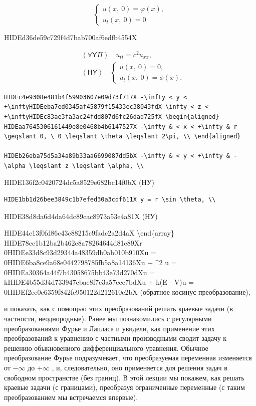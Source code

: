 \documentclass[
  ukrainian,
]{article}
\begin{document}
\[
\begin{cases} u(x, \ 0) = \varphi(x), \\ u_t(x, \ 0) = 0 \end{cases}
\]

HIDEd36de59c729f4d7bab700af6edfb4554X

\[
\begin{aligned} & (\forall \mathsf{Y}\Pi) \quad u_{tt} = c^2 u_{xx}, \\ & (\mathsf{H} \mathsf{Y}) \quad \begin{cases} u\left(x, \ 0\right) = 0, \\ u_t\left(x, \ 0\right) = \phi\left(x\right). \end{cases} \end{aligned}
\]

\begin{verbatim}
HIDEc4e9308e481b4f59903607e09d73f717X -\infty < y < +\inftyHIDEeba7ed0345af45879f15433ec38043fdX-\infty < z < +\inftyHIDEc83ae3fa3ac24fdd807d6fc26dad725fX \begin{aligned}
HIDEaa7645306161449e8e0468b4b6147527X -\infty & < x < +\infty & r \geqslant 0, \ 0 \leqslant \theta \leqslant 2\pi, \\ \end{aligned}

HIDEb26eba75d5a34a89b33aa6699087dd5bX -\infty & < y < +\infty & -\alpha \leqslant z \leqslant \alpha, \\
\end{verbatim}

HIDE136f2c0420724dc5a8529e682bc14f0bX (НУ)

\begin{verbatim}
HIDE1bb1d26bee3849c1b7efed30a3cdf611X y = r \sin \theta, \\
\end{verbatim}

HIDE38d8da6d4da64dc89cac8973a53e4a81X (НУ)

HIDE44c13f0fd86c43c88215c9fadc2a2d4aX \textbackslash end\{array\}
HIDE78ee1b12ba2b462e8a78264644d81e89Xr
\geqslant 0HIDEe33d8c93d29344a48359db0ab010b910X\Delta u =
0HIDE6ba8ce9a68e0442798785fb5a8a14136X\Delta u + \lambda\^{}2 u =
0HIDEa30364a44f7b43058675bb43e73d270dX\Delta u =
kHIDE4b55d34d733947cbae8f7c3a57ece7bdX\Delta u + k(E - V)u =
0HIDEf2ee0e6359f842fe950122d212610c2bX (обратное
косинус-преобразование),

и показать, как с помощью этих преобразований решать краевые задачи (в
частности, неоднородные). Ранее мы познакомились с регулярными
преобразованиями Фурье и Лапласа и увидели, как применение этих
преобразований к уравнению с частными производными сводит задачу к
решению обыкновениого дифференциального уравнения. Обычное
преобразование Фурье подразумевает, что преобразуемая переменная
изменяется от \(-\infty\) до \(+\infty\) , и, следовательно, оно
применяется для решения задач в свободном пространстве (без границ). В
этой лекции мы покажем, как решать краевые задачи (с границами),
преобразуя ограниченные переменные (с таким преобразованием мы
встречаемся впервые).
\end{document}
